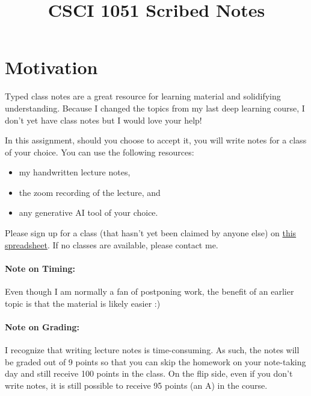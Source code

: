 \documentclass{article}
\title{CSCI 1051 Scribed Notes}
\date{}
\begin{document}
\maketitle

\section*{Motivation}

Typed class notes are a great resource for learning material and solidifying understanding.
Because I changed the topics from my last deep learning course, I don't yet have class notes but I would love your help!

In this assignment, should you choose to accept it, you will write notes for a class of your choice. You can use the following resources:
\begin{itemize}
    \item my handwritten lecture notes,
    \item the zoom recording of the lecture, and
    \item any generative AI tool of your choice.
\end{itemize}

Please sign up for a class (that hasn't yet been claimed by anyone else) on \href{https://docs.google.com/spreadsheets/d/18PWX6a_zg5qmj2239nig4vYlq4IUhKRv0tRu2yGz9_A/edit?usp=sharing}{this spreadsheet}. If no classes are available, please contact me. 

\paragraph{Note on Timing:} Even though I am normally a fan of postponing work, the benefit of an earlier topic is that the material is likely easier :)

\paragraph{Note on Grading:} I recognize that writing lecture notes is time-consuming. As such, the notes will be graded out of 9 points so that you can skip the homework on your note-taking day and still receive 100 points in the class.
On the flip side, even if you don't write notes, it is still possible to receive 95 points (an A) in the course.
\end{document}

